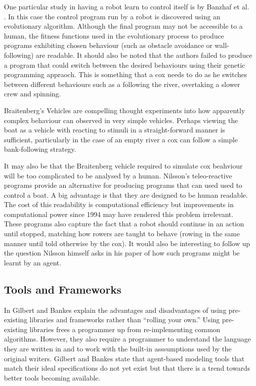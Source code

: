 One particular study in having a robot learn to control itself is by
Banzhaf et al. \cite{Banzhaf1997}. In this case the control program
run by a robot is discovered using an evolutionary algorithm. Although the final program may not be accessible to a
human, the fitness functions used in
the evolutionary process to produce programs exhibiting chosen
behaviour (such as obstacle avoidance or wall-following) are
readable. It should also be noted that the authors failed to produce a program that could switch between the
desired behaviours using their genetic programming appraoch. This is something that a cox needs to do as he
switches between different behaviours such as a following the river, overtaking a
slower crew and spinning.

Braitenberg's Vehicles \cite{Braitenberg1986} are compelling
thought experiments into how apparently complex behaviour can observed in
very simple vehicles. Perhaps viewing the boat as a vehicle with
reacting to stimuli in a straight-forward manner is
sufficient, particularly in the case of an empty river a cox can follow a
simple bank-following strategy.

It may also be that the Braitenberg vehicle required to simulate cox
beahviour will be too complicated to be analysed by a human. Nilsson's
teleo-reactive programs \cite{Nilsson1994} provide an
alternative for producing programs that can used used to control a
boat. A big advantage is that they are designed to be human
readable. The cost of this readability is computational efficiency but
improvements in
computational power since 1994 may have rendered this problem
irrelevant. These programs also capture the fact that a robot should
continue in an action until stopped, matching how rowers are taught to
behave
(rowing in the same manner until told otherwise by the cox). It
would also be interesting to follow up the question Nilsson himself
asks in his paper of how such programs might be learnt by an agent.

\subsection{Tools and Frameworks}
In \cite{Gilbert2002} Gilbert and Bankes explain the advantages and
disadvantages of using pre-existing libraries and frameworks rather
than ``rolling your own.'' Using pre-existing libraries frees a
programmer up from re-implementing common
algorithms. However, they also require a programmer to understand the
language they are written in and to work with the built-in
asssumptions used by the original writers. Gilbert and Bankes state
that agent-based modeling tools that match their ideal specifications
do not yet exist but that there is a trend towards better
tools becoming available.

